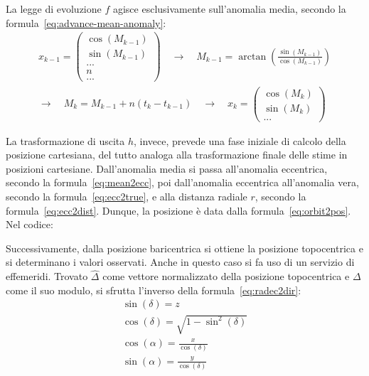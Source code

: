 \documentclass[12pt,a4paper,openright,twoside]{book}
\begin{document}
La legge di evoluzione $f$ agisce esclusivamente sull'anomalia media, secondo la formula~\ref{eq:advance-mean-anomaly}:
\begin{gather*}
x_{k-1}=\begin{pmatrix}
\cos(M_{k-1}) \\
\sin(M_{k-1}) \\
... \\
n \\
...
\end{pmatrix}
\quad\rightarrow\quad
M_{k-1}=\arctan\left(\frac{\sin(M_{k-1})}{\cos(M_{k-1})}\right) \\
\rightarrow\quad
M_k=M_{k-1}+n(t_k-t_{k-1})
\quad\rightarrow\quad
x_k=\begin{pmatrix}
\cos(M_k) \\
\sin(M_k) \\
...
\end{pmatrix}
\end{gather*}



La trasformazione di uscita $h$, invece, prevede una fase iniziale di calcolo della posizione cartesiana, del tutto analoga alla trasformazione finale delle stime in posizioni cartesiane. Dall'anomalia media si passa all'anomalia eccentrica, secondo la formula~\ref{eq:mean2ecc}, poi dall'anomalia eccentrica all'anomalia vera, secondo la formula~\ref{eq:ecc2true}, e alla distanza radiale $r$, secondo la formula~\ref{eq:ecc2dist}. Dunque, la posizione è data dalla formula~\ref{eq:orbit2pos}. Nel codice:



Successivamente, dalla posizione baricentrica si ottiene la posizione topocentrica e si determinano i valori osservati. Anche in questo caso si fa uso di un servizio di effemeridi. Trovato $\hat{\Delta}$ come vettore normalizzato della posizione topocentrica e $\Delta$ come il suo modulo, si sfrutta l'inverso della formula~\ref{eq:radec2dir}:
\begin{gather}
\sin(\delta)=z \\
\cos(\delta)=\sqrt{1-\sin^2(\delta)} \\
\cos(\alpha)=\frac{x}{\cos(\delta)} \\
\sin(\alpha)=\frac{y}{\cos(\delta)}
\end{gather}
\end{document}
